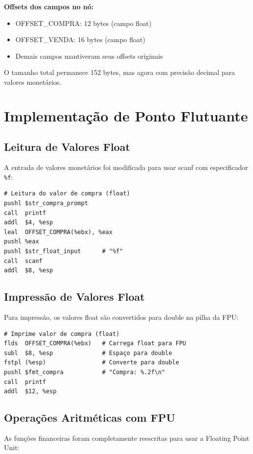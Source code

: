 \documentclass[12pt]{article}
\begin{document}
\textbf{Offsets dos campos no nó:}
\begin{itemize}
    \item OFFSET\_COMPRA: 12 bytes (campo float)
    \item OFFSET\_VENDA: 16 bytes (campo float)
    \item Demais campos mantiveram seus offsets originais
\end{itemize}

O tamanho total permanece 152 bytes, mas agora com precisão decimal para valores monetários.

\section{Implementação de Ponto Flutuante}

\subsection{Leitura de Valores Float}
A entrada de valores monetários foi modificada para usar scanf com especificador \texttt{\%f}:

\begin{verbatim}
# Leitura do valor de compra (float)
pushl $str_compra_prompt
call  printf
addl  $4, %esp
leal  OFFSET_COMPRA(%ebx), %eax
pushl %eax
pushl $str_float_input      # "%f"
call  scanf
addl  $8, %esp
\end{verbatim}

\subsection{Impressão de Valores Float}
Para impressão, os valores float são convertidos para double na pilha da FPU:

\begin{verbatim}
# Imprime valor de compra (float)
flds  OFFSET_COMPRA(%ebx)   # Carrega float para FPU
subl  $8, %esp              # Espaço para double
fstpl (%esp)                # Converte para double
pushl $fmt_compra           # "Compra: %.2f\n"
call  printf
addl  $12, %esp
\end{verbatim}

\subsection{Operações Aritméticas com FPU}
As funções financeiras foram completamente reescritas para usar a Floating Point Unit:
\end{document}

